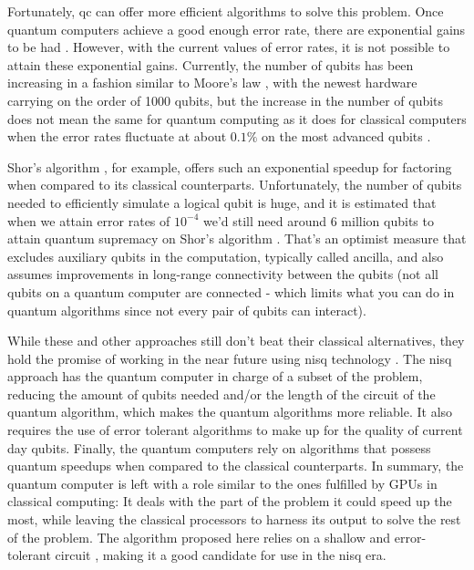 \documentclass{aux/ttuthes2007}
\begin{document}
Fortunately, \gls{qc}  can offer more efficient algorithms to solve this problem.
Once quantum computers achieve a good enough error rate, there are exponential gains to be had .
However, with the current values of error rates, it is not possible to attain these exponential gains.
Currently, the number of qubits has been increasing in a fashion similar to Moore's law , with the newest hardware carrying on the order of 1000 qubits, but the increase in the number of qubits does not mean the same for quantum computing as it does for classical computers when the error rates fluctuate at about $0.1\%$ on the most advanced qubits .

Shor's algorithm , for example, offers such an exponential speedup for factoring when compared to its classical counterparts.
Unfortunately, the number of qubits needed to efficiently simulate a logical qubit is huge, and it is estimated that when we attain error rates of $10^{-4}$ we'd still need around 6 million qubits to attain quantum supremacy on Shor's algorithm \cite{shor}. 
That's an optimist measure that excludes auxiliary qubits in the computation, typically called ancilla, and also assumes improvements in long-range connectivity between the qubits (not all qubits on a quantum computer are connected - which limits what you can do in quantum algorithms since not every pair of qubits can interact).

While these and other approaches still don't beat their classical alternatives, they hold the promise of working in the near future using \gls{nisq} technology \cite{nisq}.
The \gls{nisq} approach has the quantum computer in charge of a subset of the problem, reducing the amount of qubits needed and/or the length of the circuit of the quantum algorithm, which makes the quantum algorithms more reliable.
It also requires the use of error tolerant algorithms to make up for the quality of current day qubits.
Finally, the quantum computers rely on algorithms that possess quantum speedups when compared to the classical counterparts.
In summary, the quantum computer is left with a role similar to the ones fulfilled by GPUs in classical computing: It deals with the part of the problem it could speed up the most, while leaving the classical processors to harness its output to solve the rest of the problem.
The algorithm proposed here relies on a shallow and error-tolerant circuit , making it a good candidate for use in the \gls{nisq} era.
\end{document}
